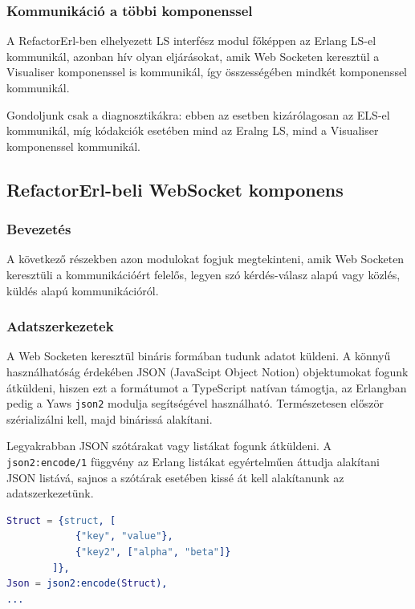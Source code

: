 \subsubsection{Kommunikáció a többi komponenssel}

A RefactorErl-ben elhelyezett LS interfész modul főképpen az Erlang LS-el kommunikál, azonban hív olyan eljárásokat, amik Web Socketen keresztül a Visualiser komponenssel is kommunikál, így összességében mindkét komponenssel kommunikál.

Gondoljunk csak a diagnosztikákra: ebben az esetben kizárólagosan az ELS-el kommunikál, míg kódakciók esetében mind az Eralng LS, mind a Visualiser komponenssel kommunikál.



\subsection{RefactorErl-beli WebSocket komponens}

\subsubsection{Bevezetés}
A következő részekben azon modulokat fogjuk megtekinteni, amik Web Socketen keresztüli a kommunikációért felelős, legyen szó kérdés-válasz alapú vagy közlés, küldés alapú kommunikációról.

\subsubsection{Adatszerkezetek}
A Web Socketen keresztül bináris formában tudunk adatot küldeni. A könnyű használhatóság érdekében JSON (JavaScipt Object Notion) objektumokat fogunk átküldeni, hiszen ezt a formátumot a TypeScript natívan támogtja, az Erlangban pedig a Yaws \lstinline{json2} modulja segítségével használható. Természetesen először szérializálni kell, majd binárissá alakítani.

Legyakrabban JSON szótárakat vagy listákat fogunk átküldeni. A \lstinline{json2:encode/1} függvény az Erlang listákat egyértelműen áttudja alakítani JSON listává, sajnos a szótárak esetében kissé át kell alakítanunk az adatszerkezetünk.

\lstset{caption=Példa szótárak átalakítása, label=mapConvertJson}
\begin{lstlisting}[language={erlang}] 
Struct = {struct, [
            {"key", "value"}, 
            {"key2", ["alpha", "beta"]}
        ]},
Json = json2:encode(Struct),
...
\end{lstlisting}

